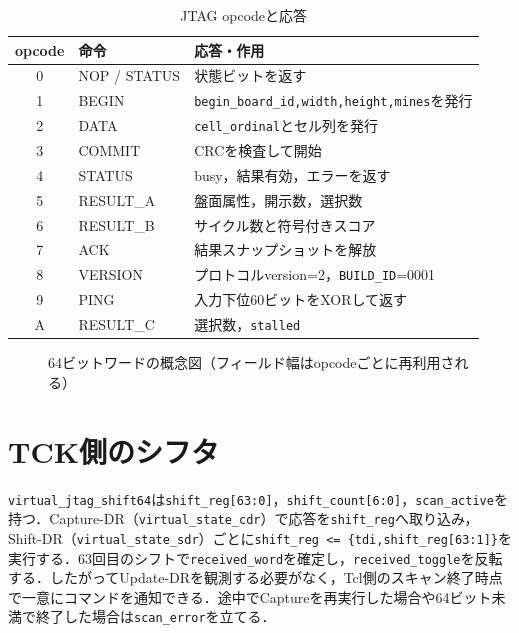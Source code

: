 \begin{table}[tb]
\centering
\caption{JTAG opcodeと応答}
\label{tab:jtag-op}
\begin{tabular}{c|l|l}
opcode&命令&応答・作用\\\hline
0&NOP / STATUS&状態ビットを返す\\
1&BEGIN&\texttt{begin\_board\_id,width,height,mines}を発行\\
2&DATA&\texttt{cell\_ordinal}とセル列を発行\\
3&COMMIT&CRCを検査して開始\\
4&STATUS&busy，結果有効，エラーを返す\\
5&RESULT\_A&盤面属性，開示数，選択数\\
6&RESULT\_B&サイクル数と符号付きスコア\\
7&ACK&結果スナップショットを解放\\
8&VERSION&プロトコルversion=2，\texttt{BUILD\_ID}=0001\\
9&PING&入力下位60ビットをXORして返す\\
A&RESULT\_C&選択数，\texttt{stalled}\\
\end{tabular}
\end{table}

\begin{figure}[tb]
\centering
{}
\caption{64ビットワードの概念図（フィールド幅はopcodeごとに再利用される）}
\label{fig:jtag-word}
\end{figure}

\section{TCK側のシフタ}
\texttt{virtual\_jtag\_shift64}は\texttt{shift\_reg[63:0]}，\texttt{shift\_count[6:0]}，\texttt{scan\_active}を持つ．Capture-DR（\texttt{virtual\_state\_cdr}）で応答を\texttt{shift\_reg}へ取り込み，Shift-DR（\texttt{virtual\_state\_sdr}）ごとに\texttt{shift\_reg <= \{tdi,shift\_reg[63:1]\}}を実行する．63回目のシフトで\texttt{received\_word}を確定し，\texttt{received\_toggle}を反転する．したがってUpdate-DRを観測する必要がなく，Tcl側のスキャン終了時点で一意にコマンドを通知できる．途中でCaptureを再実行した場合や64ビット未満で終了した場合は\texttt{scan\_error}を立てる．

